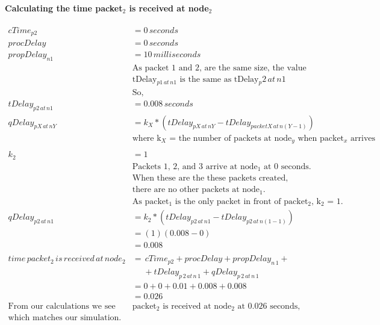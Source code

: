 \documentclass[fleqn,11pt]{article}
\begin{document}
\paragraph{Calculating the time packet$_2$ is received at node$_2$ }
\begin{align*}
cTime_{p2} &= 0\,seconds\\
procDelay &= 0\,seconds\\
propDelay_{n1} &= 10\,milliseconds\\
&\text{As packet 1 and 2, are the same size, the value for}\\
&\text{tDelay$_{p1\,at\,n1}$ is the same as tDelay${_p2\,at\,n1}$}\\
&\text{So,}\\
tDelay_{p2\,at\,n1} &=  0.008 \,seconds\\
qDelay_{pX\,at\,nY} &= k_{X}*(tDelay_{pX\,at\,nY} - tDelay_{packetX\,at\,n(Y-1)}) \\
&\text{where k$_X$ = the number of packets at node$_y$ when packet$_x$ arrives}\\
\\
k_{2} &= 1\\
&\text{Packets 1, 2, and 3 arrive at node$_1$ at 0 seconds.}\\
&\text{When these are the these packets created,}\\
&\text{there are no other packets at node$_1$.}\\
&\text{As packet$_1$ is the only packet in front of packet$_2$, k$_2$ = 1.} \\
qDelay_{p2\,at\,n1} &= k_{2}*(tDelay_{p2\,at\,n1} - tDelay_{p2\,at\,n(1-1)})\\
&= (1) (0.008 - 0) \\
&= 0.008 \\
\\
time\,packet_{2}\,is\,received\,at\,node_{2} &= \,cTime_{p2} + procDelay + propDelay_{n\,1} +\\
&\,\,\,\,\,\,\,\, + tDelay_{p\,2\,at\,n\,1} + qDelay_{p\,2\,at\,n\,1} \\
&= 0 + 0 + 0.01 + 0.008 + 0.008 \\
&= 0.026\\
\text{From our calculations we see that }
&\text{packet$_2$ is received at node$_2$ at 0.026 seconds,} \\
\text{which matches our simulation.}
\end{align*}
\end{document}
